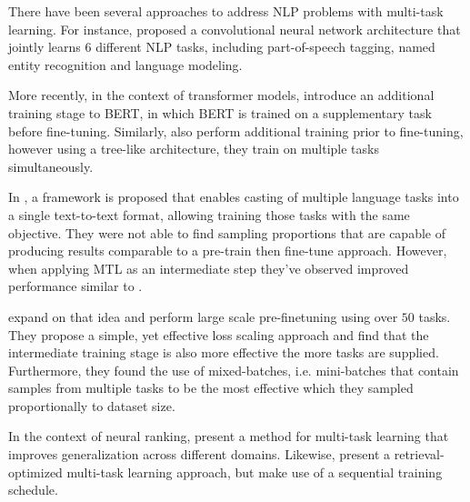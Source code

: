 There have been several approaches to address NLP problems with multi-task learning. For instance, \citep{10.1145/1390156.1390177} proposed a convolutional neural network architecture that jointly learns 6 different NLP tasks, including part-of-speech tagging, named entity recognition and language modeling.

More recently, in the context of transformer models, \citet{DBLP:journals/corr/abs-1811-01088} introduce an additional training stage to BERT, in which BERT is trained on a supplementary task before fine-tuning. Similarly, \citet{DBLP:journals/corr/abs-1901-11504} also perform additional training prior to fine-tuning, however using a tree-like architecture, they train on multiple tasks simultaneously.

In \citep{DBLP:journals/corr/abs-1910-10683}, a framework is proposed that enables casting of multiple language tasks into a single text-to-text format, allowing training those tasks with the same objective. They were not able to find sampling proportions that are capable of producing results comparable to a pre-train then fine-tune approach. However, when applying MTL as an intermediate step they've observed improved performance similar to \citet{DBLP:journals/corr/abs-1901-11504}.

\citet{aghajanyan-etal-2021-muppet} expand on that idea and perform large scale pre-finetuning using over $50$ tasks. They propose a simple, yet effective loss scaling approach and find that the intermediate training stage is also more effective the more tasks are supplied. Furthermore, they found the use of mixed-batches, i.e. mini-batches that contain samples from multiple tasks to be the most effective which they sampled proportionally to dataset size.

In the context of neural ranking, \citet{maillard-etal-2021-multi} present a method for multi-task learning that improves generalization across different domains. Likewise, \citet{Fun2021EfficientRO} present a retrieval-optimized multi-task learning approach, but make use of a sequential training schedule.